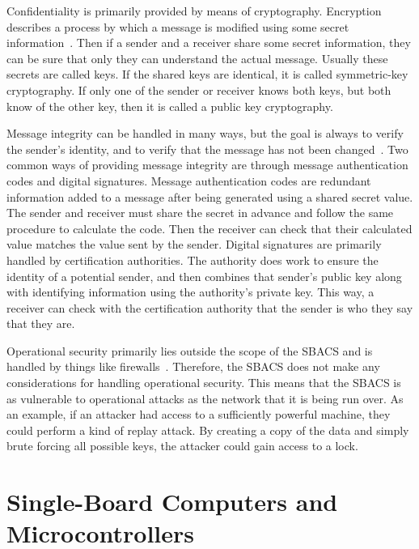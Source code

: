 \documentclass[12pt]{report}
\let\Oldsection\section
\renewcommand{\section}{\FloatBarrier\Oldsection}
\begin{document}
Confidentiality is primarily provided by means of cryptography. Encryption describes a process by which a message is
modified using some secret information~\autocite{NETWORKTEXTBOOK}. Then if a sender and a receiver share some secret
information, they can be sure that only they can understand the actual message. Usually these secrets are called 
keys. If the shared keys
are identical, it is called symmetric-key cryptography. If only one of the sender or receiver knows both keys, but both
know of the other key, then it is called a public key cryptography.

Message integrity can be handled in many ways, but the goal is always to verify the sender's identity, and to verify
that the message has not been changed~\autocite{NETWORKTEXTBOOK}. Two common ways of providing message integrity are
through message authentication codes and digital signatures. Message authentication codes are redundant information
added to a message after being generated using a shared secret value. The sender and receiver must share the secret in
advance and follow the same procedure to calculate the code. Then the receiver can check that their calculated value
matches the value sent by the sender. Digital signatures are primarily handled by certification authorities. The
authority does work to ensure the identity of a potential sender, and then combines that sender's public key along with
identifying information using the authority's private key. This way, a receiver can check with the certification
authority that the sender is who they say that they are.

Operational security primarily lies outside the scope of the SBACS and is handled by things like firewalls~\autocite
{NETWORKTEXTBOOK}. Therefore, the SBACS does not make any considerations for handling operational security. This means
that the SBACS is as vulnerable to operational attacks as the network that it is being run over. As an example, if an
attacker had access to a sufficiently powerful machine, they could perform a kind of replay attack. By creating a copy
of the data and simply brute forcing all possible keys, the attacker could gain access to a lock.


\section{Single-Board Computers and Microcontrollers} \label{single-board-computers-and-microcontrollers}
\end{document}
